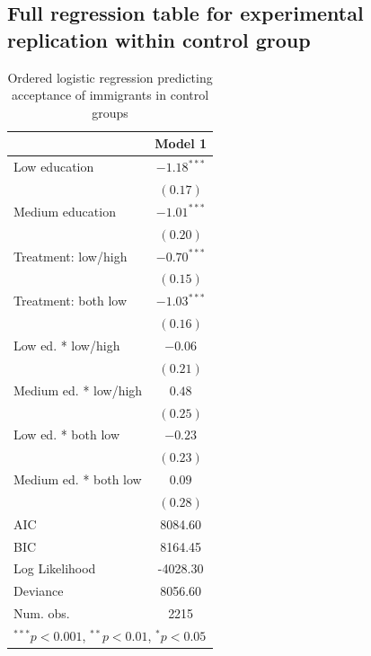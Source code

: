 \documentclass{article}\usepackage[]{graphicx}\usepackage[]{color}
\begin{document}
\begin{appendix}


\section{Full regression table for experimental replication within control group}


\begin{table}
\begin{center}
\begin{tabular}{l c }
\hline
 & Model 1 \\
\hline
Low education         & $-1.18^{***}$ \\
                      & $(0.17)$      \\
Medium education      & $-1.01^{***}$ \\
                      & $(0.20)$      \\
Treatment: low/high   & $-0.70^{***}$ \\
                      & $(0.15)$      \\
Treatment: both low   & $-1.03^{***}$ \\
                      & $(0.16)$      \\
Low ed. * low/high    & $-0.06$       \\
                      & $(0.21)$      \\
Medium ed. * low/high & $0.48$        \\
                      & $(0.25)$      \\
Low ed. * both low    & $-0.23$       \\
                      & $(0.23)$      \\
Medium ed. * both low & $0.09$        \\
                      & $(0.28)$      \\
\hline
AIC                   & 8084.60       \\
BIC                   & 8164.45       \\
Log Likelihood        & -4028.30      \\
Deviance              & 8056.60       \\
Num. obs.             & 2215          \\
\hline
\multicolumn{2}{l}{\scriptsize{$^{***}p<0.001$, $^{**}p<0.01$, $^*p<0.05$}}
\end{tabular}
\caption{Ordered logistic regression predicting acceptance of immigrants in control groups}
\label{table:mainreplication}
\end{center}
\end{table}




\end{appendix}
\end{document}
